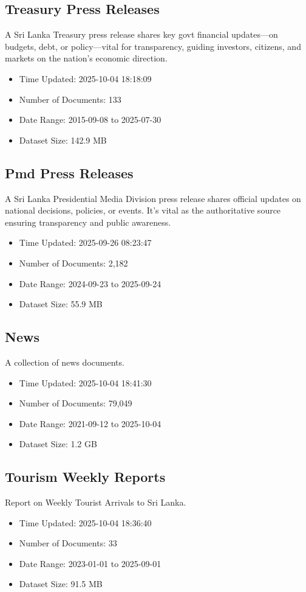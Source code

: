 \documentclass{article}%
\begin{document}
%
\subsection{Treasury Press Releases}%
\label{subsec:TreasuryPressReleases}%
A Sri Lanka Treasury press release shares key govt financial updates—on budgets, debt, or policy—vital for transparency, guiding investors, citizens, and markets on the nation’s economic direction.%
\begin{itemize}%
\item%
Time Updated: 2025{-}10{-}04 18:18:09%
\item%
Number of Documents: 133%
\item%
Date Range: 2015{-}09{-}08 to 2025{-}07{-}30%
\item%
Dataset Size: 142.9 MB%
\end{itemize}

%
\subsection{Pmd Press Releases}%
\label{subsec:PmdPressReleases}%
A Sri Lanka Presidential Media Division press release shares official updates on national decisions, policies, or events. It’s vital as the authoritative source ensuring transparency and public awareness.%
\begin{itemize}%
\item%
Time Updated: 2025{-}09{-}26 08:23:47%
\item%
Number of Documents: 2,182%
\item%
Date Range: 2024{-}09{-}23 to 2025{-}09{-}24%
\item%
Dataset Size: 55.9 MB%
\end{itemize}

%
\subsection{News}%
\label{subsec:News}%
A collection of news documents.%
\begin{itemize}%
\item%
Time Updated: 2025{-}10{-}04 18:41:30%
\item%
Number of Documents: 79,049%
\item%
Date Range: 2021{-}09{-}12 to 2025{-}10{-}04%
\item%
Dataset Size: 1.2 GB%
\end{itemize}

%
\subsection{Tourism Weekly Reports}%
\label{subsec:TourismWeeklyReports}%
Report on Weekly Tourist Arrivals to Sri Lanka.%
\begin{itemize}%
\item%
Time Updated: 2025{-}10{-}04 18:36:40%
\item%
Number of Documents: 33%
\item%
Date Range: 2023{-}01{-}01 to 2025{-}09{-}01%
\item%
Dataset Size: 91.5 MB%
\end{itemize}
\end{document}
